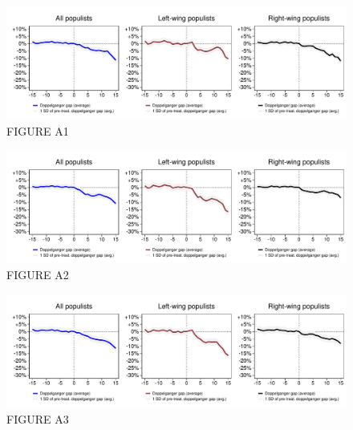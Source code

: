 \documentclass{article}
\begin{document}
\clearpage

\begin{figure}	
	\caption{FIGURE A1} 
		\includegraphics[scale=0.5]{FigureA1}\centering	
\end{figure}

\clearpage

\begin{figure}	
	\caption{FIGURE A2} 
		\includegraphics[scale=0.5]{FigureA2}\centering	
\end{figure}

\clearpage

\begin{figure}	
	\caption{FIGURE A3} 
		\includegraphics[scale=0.5]{FigureA3}\centering	
\end{figure}

\clearpage
\end{document}
